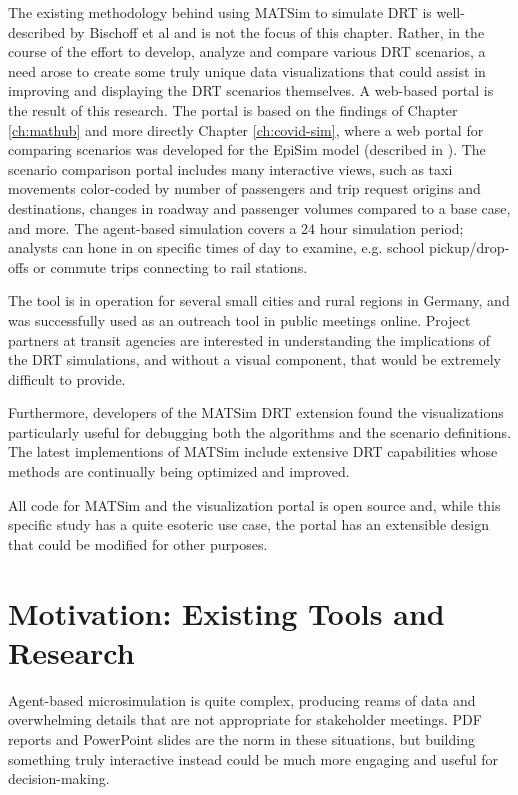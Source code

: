 The existing methodology behind using MATSim to simulate DRT is well-described by Bischoff et al \cite{BischoffMaciejewskiNagel2017SharedTaxiIITSC} and is not the focus of this chapter. Rather, in the course of the effort to develop, analyze and compare various DRT scenarios, a need arose to create some truly unique data visualizations that could assist in improving and displaying the DRT scenarios themselves. A web-based portal is the result of this research. The portal is based on the findings of Chapter \ref{ch:mathub} and more directly Chapter \ref{ch:covid-sim}, where a web portal for comparing scenarios was developed for the EpiSim model (described in \cite{MuellerEtAl2021episim}). The scenario comparison portal includes many interactive views, such as taxi movements color-coded by number of passengers and trip request origins and destinations, changes in roadway and passenger volumes compared to a base case, and more. The agent-based simulation covers a 24 hour simulation period; analysts can hone in on specific times of day to examine, e.g. school pickup/drop-offs or commute trips connecting to rail stations.

The tool is in operation for several small cities and rural regions in Germany, and was successfully used as an outreach tool in public meetings online. Project partners at transit agencies are interested in understanding the implications of the DRT simulations, and without a visual component, that would be extremely difficult to provide.

Furthermore, developers of the MATSim DRT extension found the visualizations particularly useful for debugging both the algorithms and the scenario definitions. The latest implementions of MATSim include extensive DRT capabilities whose methods are continually being optimized and improved.

All code for MATSim and the visualization portal is open source and, while this specific study has a quite esoteric use case, the portal has an extensible design that could be modified for other purposes.

\section{Motivation: Existing Tools and Research}
\label{avov-motivation}

Agent-based microsimulation is quite complex, producing reams of data and overwhelming details that are not appropriate for stakeholder meetings. PDF reports and PowerPoint slides are the norm in these situations, but building something truly interactive instead could be much more engaging and useful for decision-making.

